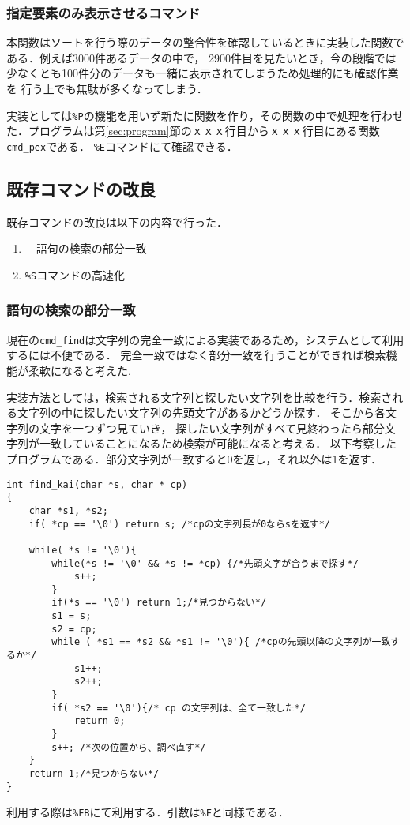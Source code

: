 \documentclass[a4j,11pt]{jarticle}
\begin{document}
\subsubsection{指定要素のみ表示させるコマンド}\label{sec:printyouso}
本関数はソートを行う際のデータの整合性を確認しているときに実装した関数である．例えば3000件あるデータの中で，
2900件目を見たいとき，今の段階では少なくとも100件分のデータも一緒に表示されてしまうため処理的にも確認作業を
行う上でも無駄が多くなってしまう．

実装としては\verb|%P|の機能を用いず新たに関数を作り，その関数の中で処理を行わせた．プログラムは第\ref{sec:program}節のｘｘｘ行目からｘｘｘ行目にある関数\verb|cmd_pex|である．
\verb|%E|コマンドにて確認できる．
\subsection{既存コマンドの改良}\label{sec:kison}
既存コマンドの改良は以下の内容で行った．
\begin{enumerate}
\setlength{\parskip}{2pt} \setlength{\itemsep}{2pt}
    \item　語句の検索の部分一致
    \item \verb|%S|コマンドの高速化
\end{enumerate}
\subsubsection{語句の検索の部分一致}
現在の\verb|cmd_find|は文字列の完全一致による実装であるため，システムとして利用するには不便である．
完全一致ではなく部分一致を行うことができれば検索機能が柔軟になると考えた.

実装方法としては，検索される文字列と探したい文字列を比較を行う．検索される文字列の中に探したい文字列の先頭文字があるかどうか探す．
そこから各文字列の文字を一つずつ見ていき，
探したい文字列がすべて見終わったら部分文字列が一致していることになるため検索が可能になると考える．
以下考察したプログラムである．部分文字列が一致すると$0$を返し，それ以外は$1$を返す．
\begin{verbatim}
int find_kai(char *s, char * cp)
{
	char *s1, *s2;
	if( *cp == '\0') return s; /*cpの文字列長が0ならsを返す*/ 

	while( *s != '\0'){
		while(*s != '\0' && *s != *cp) {/*先頭文字が合うまで探す*/
			s++;
		}
		if(*s == '\0') return 1;/*見つからない*/
		s1 = s;
		s2 = cp;
		while ( *s1 == *s2 && *s1 != '\0'){ /*cpの先頭以降の文字列が一致するか*/
			s1++;
			s2++;
		}
		if( *s2 == '\0'){/* cp の文字列は、全て一致した*/
			return 0;
		}
		s++; /*次の位置から、調べ直す*/
	}
	return 1;/*見つからない*/
}
\end{verbatim}
利用する際は\verb|%FB|にて利用する．引数は\verb|%F|と同様である．
\end{document}

